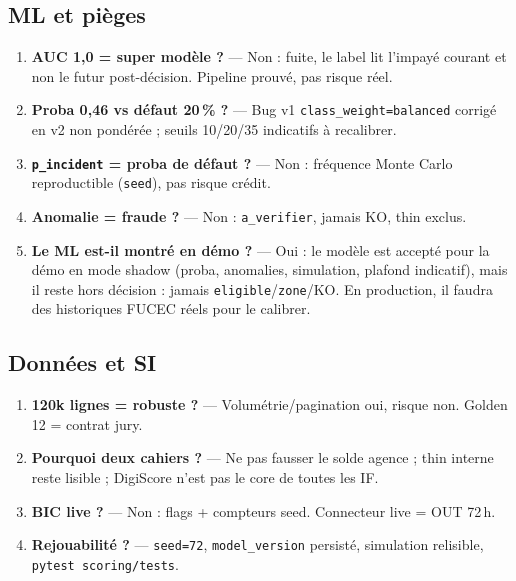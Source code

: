 \documentclass[11pt,a4paper]{article}
\begin{document}
\subsection{ML et pièges}
\begin{enumerate}[resume]
  \item \textbf{AUC 1,0 = super modèle ?} --- Non : fuite, le label lit l'impayé courant et non le futur post-décision. Pipeline prouvé, pas risque réel.
  \item \textbf{Proba 0,46 vs défaut 20\,\% ?} --- Bug v1 \texttt{class\_weight=balanced} corrigé en v2 non pondérée ; seuils 10/20/35 indicatifs à recalibrer.
  \item \textbf{\texttt{p\_incident} = proba de défaut ?} --- Non : fréquence Monte Carlo reproductible (\texttt{seed}), pas risque crédit.
  \item \textbf{Anomalie = fraude ?} --- Non : \texttt{a\_verifier}, jamais KO, thin exclus.
  \item \textbf{Le ML est-il montré en démo ?} --- Oui : le modèle est accepté pour la démo en mode shadow (proba, anomalies, simulation, plafond indicatif), mais il reste hors décision : jamais \texttt{eligible}/\texttt{zone}/KO. En production, il faudra des historiques FUCEC réels pour le calibrer.
\end{enumerate}

\subsection{Données et SI}
\begin{enumerate}[resume]
  \item \textbf{120k lignes = robuste ?} --- Volumétrie/pagination oui, risque non. Golden 12 = contrat jury.
  \item \textbf{Pourquoi deux cahiers ?} --- Ne pas fausser le solde agence ; thin interne reste lisible ; DigiScore n'est pas le core de toutes les IF.
  \item \textbf{BIC live ?} --- Non : flags + compteurs seed. Connecteur live = OUT 72\,h.
  \item \textbf{Rejouabilité ?} --- \texttt{seed=72}, \texttt{model\_version} persisté, simulation relisible, \texttt{pytest scoring/tests}.
\end{enumerate}
\end{document}
